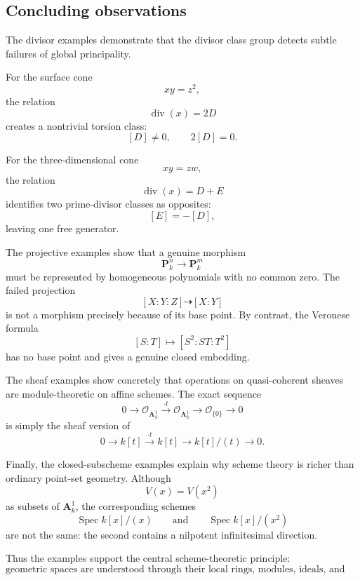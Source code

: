 \documentclass[12pt,a4paper]{article}
\DeclareMathOperator{\Spec}{Spec}
\newcommand{\OO}{\mathcal{O}}
\newcommand{\divisor}{\operatorname{div}}
\newcommand{\Z}{\mathbb{Z}}
\newcommand{\Cl}{\operatorname{Cl}}
\providecommand{\Spec}{\operatorname{Spec}}
\providecommand{\A}{\mathbb A}
\providecommand{\Pj}{\mathbb P}
\theoremstyle{notespace}
\begin{document}
\subsection{Concluding observations}

The divisor examples demonstrate that the divisor class group detects subtle failures of global principality.

For the surface cone
\[
xy=z^2,
\]
the relation
\[
\operatorname{div}(x)=2D
\]
creates a nontrivial torsion class:
\[
[D]\neq0,
\qquad
2[D]=0.
\]

For the three-dimensional cone
\[
xy=zw,
\]
the relation
\[
\operatorname{div}(x)=D+E
\]
identifies two prime-divisor classes as opposites:
\[
[E]=-[D],
\]
leaving one free generator.

The projective examples show that a genuine morphism
\[
\mathbf P^n_k\longrightarrow\mathbf P^m_k
\]
must be represented by homogeneous polynomials with no common zero. The failed projection
\[
[X:Y:Z]\dashrightarrow[X:Y]
\]
is not a morphism precisely because of its base point. By contrast, the Veronese formula
\[
[S:T]\longmapsto[S^2:ST:T^2]
\]
has no base point and gives a genuine closed embedding.

The sheaf examples show concretely that operations on quasi-coherent sheaves are module-theoretic on affine schemes. The exact sequence
\[
0
\longrightarrow
\mathcal O_{\mathbf A^1_k}
\xrightarrow{\cdot t}
\mathcal O_{\mathbf A^1_k}
\longrightarrow
\mathcal O_{\{0\}}
\longrightarrow
0
\]
is simply the sheaf version of
\[
0
\longrightarrow
k[t]
\xrightarrow{\cdot t}
k[t]
\longrightarrow
k[t]/(t)
\longrightarrow
0.
\]

Finally, the closed-subscheme examples explain why scheme theory is richer than ordinary point-set geometry. Although
\[
V(x)=V(x^2)
\]
as subsets of \(\mathbf A^1_k\), the corresponding schemes
\[
\operatorname{Spec}k[x]/(x)
\qquad\text{and}\qquad
\operatorname{Spec}k[x]/(x^2)
\]
are not the same: the second contains a nilpotent infinitesimal direction.

Thus the examples support the central scheme-theoretic principle:
\[
\boxed{
	\text{geometric spaces are understood through their local rings, modules, ideals, and rational functions.}
}
\]

%
%
\end{document}
